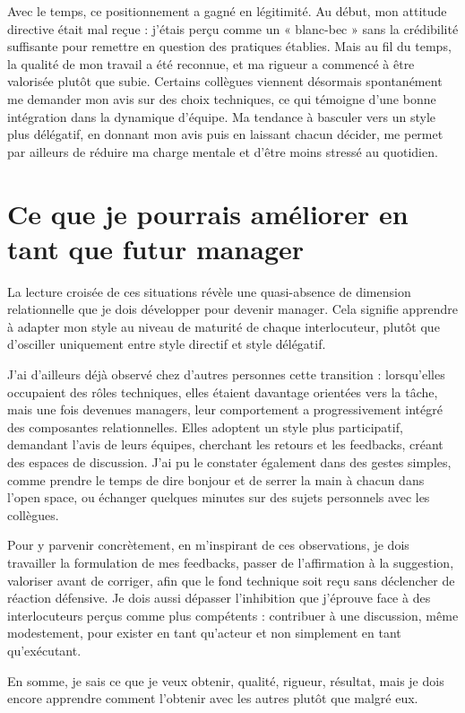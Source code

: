 \documentclass[12pt, a4paper]{article}
\begin{document}
Avec le temps, ce positionnement a gagné en légitimité. Au début, 
mon attitude directive était mal reçue : j'étais perçu comme un « blanc-bec » 
sans la crédibilité suffisante pour remettre en question des pratiques 
établies. Mais au fil du temps, la qualité de mon travail a été reconnue, 
et ma rigueur a commencé à être valorisée plutôt que subie. Certains 
collègues viennent désormais spontanément me demander mon avis sur 
des choix techniques, ce qui témoigne d'une bonne intégration 
dans la dynamique d'équipe. Ma tendance à basculer vers un style plus 
délégatif, en donnant mon avis puis en laissant chacun décider, me permet par 
ailleurs de réduire ma charge mentale et d'être moins stressé au quotidien.

\section{Ce que je pourrais améliorer en tant que futur manager}
La lecture croisée de ces situations révèle une quasi-absence de dimension
relationnelle que je dois développer pour devenir manager. Cela signifie apprendre
à adapter mon style au niveau de maturité de chaque interlocuteur, plutôt que
d'osciller uniquement entre style directif et style délégatif.

J'ai d'ailleurs déjà observé chez d'autres personnes cette transition : lorsqu'elles
occupaient des rôles techniques, elles étaient davantage orientées vers la tâche,
mais une fois devenues managers, leur comportement a progressivement intégré des
composantes relationnelles. Elles adoptent un style plus participatif, demandant
l'avis de leurs équipes, cherchant les retours et les feedbacks, créant des
espaces de discussion. J'ai pu le constater également dans des gestes simples, comme prendre le temps
de dire bonjour et de serrer la main à chacun dans l'open space, ou échanger
quelques minutes sur des sujets personnels avec les collègues.

Pour y parvenir concrètement, en m'inspirant de ces observations, je dois
travailler la formulation de mes feedbacks, passer de l'affirmation à la
suggestion, valoriser avant de corriger, afin que le fond technique soit
reçu sans déclencher de réaction défensive. Je dois aussi dépasser l'inhibition
que j'éprouve face à des interlocuteurs perçus comme plus compétents :
contribuer à une discussion, même modestement, pour exister en tant qu'acteur
et non simplement en tant qu'exécutant.

En somme, je sais ce que je veux obtenir, qualité, rigueur, résultat,
mais je dois encore apprendre comment l'obtenir avec les autres plutôt que malgré eux.



\end{document}
